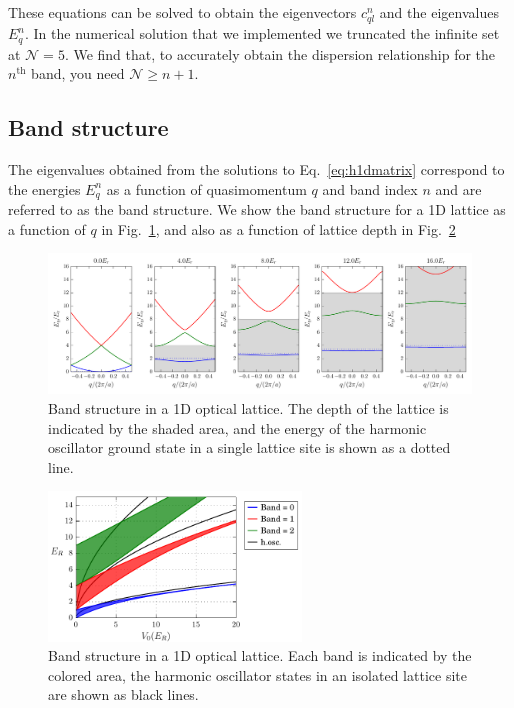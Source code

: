 These equations can be solved to obtain the eigenvectors $c_{ql}^{n}$ and the
eigenvalues $E_{q}^{n}$.  In the numerical solution that we implemented  we
truncated the infinite set at $\mathcal{N}=5$.  We find that, to accurately
obtain the dispersion relationship for the $n^{\text{th}}$ band, you need
$\mathcal{N}\geq n+1$.  

\subsection{Band structure}

The eigenvalues  obtained from the solutions to Eq.~\ref{eq:h1dmatrix}
correspond to the energies $E_{q}^{n}$ as a function of quasimomentum $q$ and
band index $n$ and are referred to as the band structure.  We show the band
structure for a 1D lattice as a function of $q$ in Fig.~\ref{fig:bands1d}, and
also as a function of lattice depth in Fig.~\ref{fig:bands1d_V0} 
\begin{figure}
\centering \includegraphics[width=\textwidth]{../figures/BandStructure_figures/bands1d.pdf}
\caption[Band structure in 1D lattice.]{\small Band structure in a 1D optical
lattice.  The depth of the lattice is indicated by the shaded area, and the
energy of the harmonic oscillator ground state in a single lattice site is shown
as a dotted line.  } \label{fig:bands1d}
\end{figure}
\begin{figure}
\centering \includegraphics[width=0.6\textwidth]{../figures/BandStructure_figures/bands1d_V0.pdf}
\caption[Band structure in 1D lattice.]{\small Band structure in a 1D optical
lattice.  Each band is indicated by the colored area,  the harmonic oscillator
states in an isolated lattice site are shown as black lines. }
\label{fig:bands1d_V0}
\end{figure}

